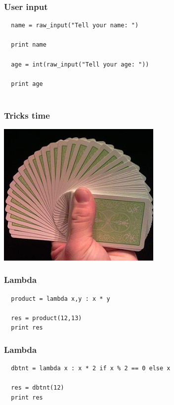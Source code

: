 \documentclass{beamer}
\begin{document}
\begin{frame}[fragile]
 \frametitle{User input}
 \begin{verbatim}
  name = raw_input("Tell your name: ")
  
  print name
  
  age = int(raw_input("Tell your age: "))
  
  print age
  
 \end{verbatim}

\end{frame}

\begin{frame}
 \frametitle{Tricks time }
 \begin{center}
  \includegraphics[height=7cm]{trick.jpg}
 \end{center}

\end{frame}


\begin{frame}[fragile]
 \frametitle{Lambda}
 \begin{verbatim}
  product = lambda x,y : x * y
  
  res = product(12,13)
  print res
 \end{verbatim}

\end{frame}

\begin{frame}[fragile]
 \frametitle{Lambda}
 \begin{verbatim}
  dbtnt = lambda x : x * 2 if x % 2 == 0 else x
  
  res = dbtnt(12)
  print res
 \end{verbatim}

\end{frame}
\end{document}
